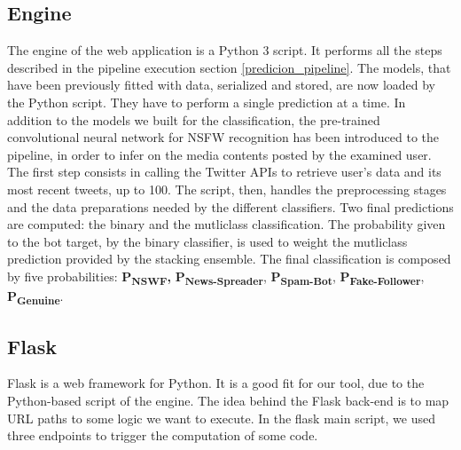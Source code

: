 \subsection{Engine}
The engine of the web application is a Python 3 script. It performs all the steps described in the pipeline execution section \ref{predicion_pipeline}.
The models, that have been previously fitted with data, serialized and stored, are now loaded by the Python script. They have to perform a single prediction at a time.
In addition to the models we built for the classification, the pre-trained convolutional neural network for NSFW recognition has been introduced to the pipeline, in order to infer on the media contents posted by the examined user.
The first step consists in calling the Twitter APIs to retrieve user's data and its most recent tweets, up to 100. 
The script, then, handles the preprocessing stages and the data preparations needed by the different classifiers.
Two final predictions are computed: the binary and the mutliclass classification.
The probability given to the bot target, by the binary classifier, is used to weight the mutliclass prediction provided by the stacking ensemble.
The final classification is composed by five probabilities: \textbf{P\textsubscript{NSWF},} \textbf{P\textsubscript{News-Spreader}}, \textbf{P\textsubscript{Spam-Bot}}, \textbf{P\textsubscript{Fake-Follower}}, \textbf{P\textsubscript{Genuine}}.
\subsection{Flask}
Flask is a web framework for Python. It is a good fit for our tool, due to the Python-based script of the engine.
The idea behind the Flask back-end is to map URL paths to some logic we want to execute. In the flask main script, we used three endpoints to trigger the computation of some code.

